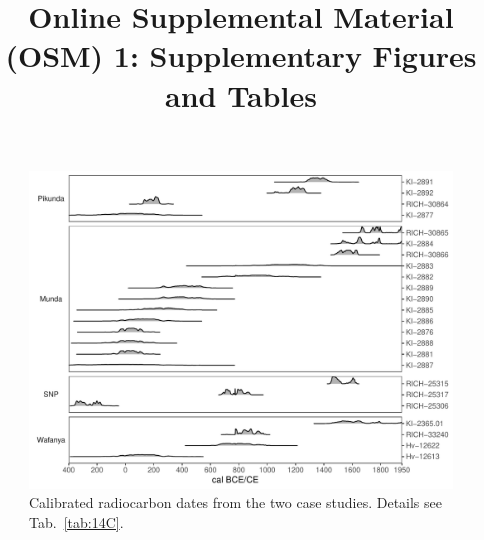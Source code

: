 \documentclass[a4paper]{article}
\title{Online Supplemental Material (OSM) 1: Supplementary Figures and Tables}
\begin{document}
\maketitle

\begin{figure}[H]
	\centering
	\includegraphics[width=\textwidth]{Fig_c14.pdf}
	\caption{Calibrated radiocarbon dates from the two case studies. Details see Tab.~\ref{tab:14C}.}
	\label{fig:c14}
\end{figure}

\end{document}
